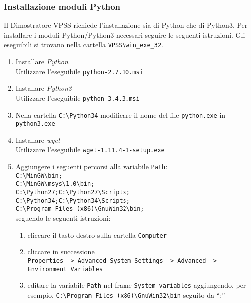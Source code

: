 \documentclass[a4paper,twoside,10pt,openany]{scrbook}
\begin{document}
\subsubsection{Installazione moduli Python}\label{sec:installazione_pymod}
Il Dimostratore VPSS richiede l'installazione sia di Python che di Python3.
Per installare i moduli Python/Python3 necessari seguire le seguenti istruzioni. Gli eseguibili si trovano nella cartella \texttt{VPSS\textbackslash win\_exe\_32}.
\begin{enumerate}
 \item Installare \emph{Python}\\
       Utilizzare l'eseguibile \texttt{python-2.7.10.msi}
 \item Installare \emph{Python3}\\
       Utilizzare l'eseguibile \texttt{python-3.4.3.msi}
 \item Nella cartella \texttt{C:\textbackslash Python34} modificare il nome del file \texttt{python.exe} in \texttt{python3.exe}
 \item Installare \emph{wget}\\
       Utilizzare l'eseguibile \texttt{wget-1.11.4-1-setup.exe}
 \item Aggiungere i seguenti percorsi alla variabile \texttt{Path}:\\
\texttt{C:\textbackslash MinGW\textbackslash bin;}\\
\texttt{C:\textbackslash MinGW\textbackslash msys\textbackslash 1.0\textbackslash bin;}\\
\texttt{C:\textbackslash Python27;C:\textbackslash Python27\textbackslash Scripts;}\\
\texttt{C:\textbackslash Python34;C:\textbackslash Python34\textbackslash Scripts;}\\
\texttt{C:\textbackslash Program Files (x86)\textbackslash GnuWin32\textbackslash bin;}\\
       seguendo le seguenti istruzioni:
       \begin{enumerate}
        \item cliccare il tasto destro sulla cartella \texttt{Computer}
        \item cliccare in successione\\
              \texttt{Properties -> Advanced System Settings -> Advanced -> Environment Variables}
        \item editare la variabile \texttt{Path} nel frame \texttt{System variables} aggiungendo, per esempio,
        \texttt{C:\textbackslash Program Files (x86)\textbackslash GnuWin32\textbackslash bin} seguito da ``;''

\end{enumerate}
\end{enumerate}
\end{document}
